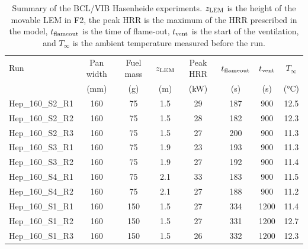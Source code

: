 \begin{table}[!ht]
\centering
\caption[Summary of the BCL/VIB Hasenheide experiments]{Summary of the BCL/VIB Hasenheide experiments. $z_{\rm LEM}$ is the height of the movable LEM in F2, the peak HRR is the maximum of the HRR prescribed in the model, $t_{\rm flameout}$ is the time of flame-out, $t_{\rm vent}$ is the start of the ventilation, and $T_\infty$ is the ambient temperature measured before the run.}
\begin{tabular}{|l|c|c|c|c|c|c|c|}
\hline
Run              & Pan width & Fuel mass & $z_{\rm LEM}$  & Peak HRR & $t_{\rm flameout}$ & $t_{\rm vent}$ & $T_\infty$ \\
                 & (mm)      & (g)       & (m)             & (kW)     & (s)                & (s)            & (\unit{\degreeCelsius}) \\ \hline \hline
Hep\_160\_S2\_R1 & 160       & 75        & 1.5             & 29       & 187                & 900            & 12.5       \\ \hline
Hep\_160\_S2\_R2 & 160       & 75        & 1.5             & 28       & 182                & 900            & 12.3       \\ \hline
Hep\_160\_S2\_R3 & 160       & 75        & 1.5             & 27       & 200                & 900            & 11.3       \\ \hline
Hep\_160\_S3\_R1 & 160       & 75        & 1.9             & 23       & 193                & 900            & 11.3       \\ \hline
Hep\_160\_S3\_R2 & 160       & 75        & 1.9             & 27       & 192                & 900            & 11.4       \\ \hline
Hep\_160\_S4\_R1 & 160       & 75        & 2.1             & 33       & 183                & 900            & 11.5       \\ \hline
Hep\_160\_S4\_R2 & 160       & 75        & 2.1             & 27       & 188                & 900            & 11.2       \\ \hline \hline
Hep\_160\_S1\_R1 & 160       & 150       & 1.5             & 27       & 334                & 1200           & 11.4       \\ \hline
Hep\_160\_S1\_R2 & 160       & 150       & 1.5             & 27       & 331                & 1200           & 12.7       \\ \hline
Hep\_160\_S1\_R3 & 160       & 150       & 1.5             & 26       & 332                & 1200           & 12.3       \\ \hline \hline

\end{tabular}
\end{table}
